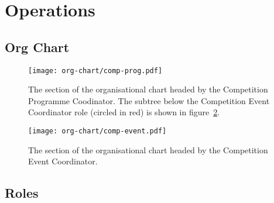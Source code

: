 \section{Operations}
\label{sec:comp-prog-ops}

\subsection{Org Chart}
\begin{landscape}
  \begin{figure}
    \begin{center}
      \texttt{[image: org-chart/comp-prog.pdf]}
    \end{center}
    \caption{\label{fig:org-chart-prog}The section of the organisational chart headed by the Competition Programme Coodinator.  The subtree below the Competition Event Coordinator role (circled in red) is shown in figure~\ref{fig:org-chart-event}.}
  \end{figure}
\end{landscape}

\begin{landscape}
  \begin{figure}
    \begin{center}
      \texttt{[image: org-chart/comp-event.pdf]}
    \end{center}
    \caption{\label{fig:org-chart-event}The section of the organisational chart headed by the Competition Event Coordinator.}
  \end{figure}
\end{landscape}

\subsection{Roles}


